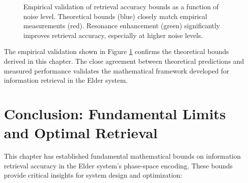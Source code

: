 \begin{figure}[h]
\centering
{}
\caption{Empirical validation of retrieval accuracy bounds as a function of noise level. Theoretical bounds (blue) closely match empirical measurements (red). Resonance enhancement (green) significantly improves retrieval accuracy, especially at higher noise levels.}
\label{fig:retrieval_accuracy_validation}
\end{figure}

The empirical validation shown in Figure \ref{fig:retrieval_accuracy_validation} confirms the theoretical bounds derived in this chapter. The close agreement between theoretical predictions and measured performance validates the mathematical framework developed for information retrieval in the Elder system.

\section{Conclusion: Fundamental Limits and Optimal Retrieval}

This chapter has established fundamental mathematical bounds on information retrieval accuracy in the Elder system's phase-space encoding. These bounds provide critical insights for system design and optimization:

